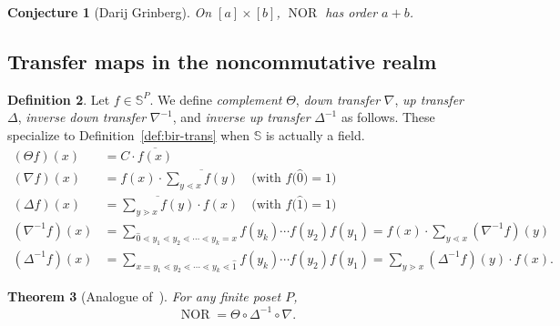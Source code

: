 \documentclass[10pt]{amsart}
\newtheorem{theo}{Theorem}[section]
\newtheorem{conj}[theo]{Conjecture}
\theoremstyle{definition}
\newtheorem{defi}[theo]{Definition}
\newcommand{\defn}[1]{\emph{#1}}
\newcommand{\bbs}{\mathbb{S}}
\newcommand{\down}{\nabla}
\newcommand{\up}{\Delta}
\DeclareMathOperator{\NOR}{NOR}
\begin{document}
\begin{conj}[Darij Grinberg]\label{conj:NOR-prod-chains}
On $[a]\times[b]$, $\NOR$ has order $a+b$.
\end{conj}

\subsection{Transfer maps in the noncommutative realm}

\begin{defi}
Let $f\in\bbs^P$. We define \defn{complement} $\Theta$, \defn{down transfer} $\down$, \defn{up
transfer} $\up$, \defn{inverse down transfer} $\down^{-1}$, and \defn{inverse up transfer}
$\up^{-1}$ 
as follows. 
These specialize to Definition~\ref{def:bir-trans} when $\bbs$ is actually a field.
\begin{align*}
 (\Theta f)(x) &= C \cdot \overline{f(x)}\\
 (\down f)(x) &= f(x) \cdot \overline{\sum\limits_{y\lessdot x}f(y)} \quad \big(\text{with } f\big(\widehat{0}\big)=1\big)\\
 (\up f)(x) &= 
 \overline{\sum\limits_{y\gtrdot x}f(y)} \cdot f(x) \quad \big(\text{with } f\big(\widehat{1}\big)=1\big)\\
 \left(\down^{-1}f\right)(x) &=
 \sum_{\widehat{0}\lessdot y_1\lessdot y_2 \lessdot \cdots \lessdot y_k=x} f(y_k)\cdots f(y_2)f(y_1) 
 =f(x) \cdot \sum\limits_{y\lessdot x}\left(\down^{-1}f\right)(y)\\
 \left(\up^{-1}f\right)(x) &=
 \sum_{x=y_1\lessdot y_2 \lessdot \cdots \lessdot y_k\lessdot \widehat{1}} f(y_k)\cdots f(y_2)f(y_1)
 =\sum\limits_{y\gtrdot x}\left(\up^{-1}f\right)(y) \cdot f(x).
\end{align*}
\end{defi}

\begin{theo}[Analogue of~{\cite[Thm. 6.2]{einpropp}}]\label{thm:NOR-transfer}
For any finite poset $P$, 
\[
\NOR=\Theta \circ \up^{-1} \circ \down.
\]
\end{theo}
\end{document}
